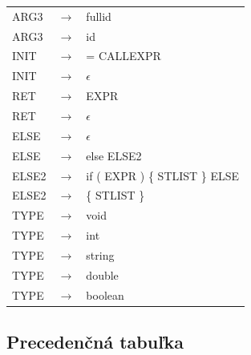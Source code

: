 \documentclass[11pt,a4paper]{article}
\begin{document}
\begin{tabular}{l c l}
ARG3 &$\rightarrow$& fullid \\
ARG3 &$\rightarrow$& id \\
INIT &$\rightarrow$& = CALLEXPR \\
INIT &$\rightarrow$& $\epsilon$ \\
RET &$\rightarrow$& EXPR \\
RET &$\rightarrow$& $\epsilon$ \\
ELSE &$\rightarrow$& $\epsilon$ \\
ELSE &$\rightarrow$& else ELSE2 \\
ELSE2 &$\rightarrow$& if ( EXPR ) \{ STLIST \} ELSE \\
ELSE2 &$\rightarrow$& \{ STLIST \} \\
TYPE &$\rightarrow$& void \\
TYPE &$\rightarrow$& int \\
TYPE &$\rightarrow$& string \\
TYPE &$\rightarrow$& double \\
TYPE &$\rightarrow$& boolean \\
\end{tabular}


\newpage
\subsection{Precedenčná tabuľka}
\label{tabulka}
\end{document}
